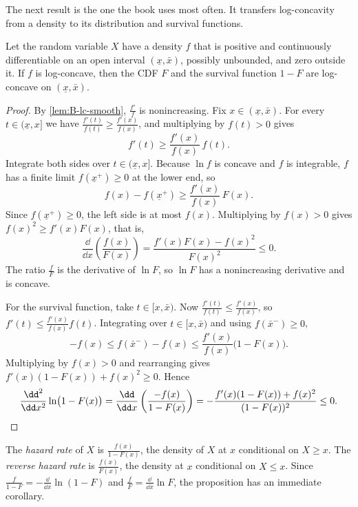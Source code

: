 The next result is the one the book uses most often. It transfers log-concavity from a density to its
distribution and survival functions.

\begin{proposition}\label{prop:B-lc-cdf}
Let the random variable $X$ have a density $f$ that is positive and continuously differentiable on an open
interval $(\underline x, \bar x)$, possibly unbounded, and zero outside it. If $f$ is log-concave, then the CDF
$F$ and the survival function $1 - F$ are log-concave on $(\underline x, \bar x)$.
\end{proposition}

\begin{proof}
By \cref{lem:B-lc-smooth}, $\frac{f'}{f}$ is nonincreasing. Fix $x \in (\underline x, \bar x)$. For every
$t \in (\underline x, x]$ we have $\frac{f'(t)}{f(t)} \geq \frac{f'(x)}{f(x)}$, and multiplying by $f(t) > 0$ gives
\[
  f'(t) \geq \frac{f'(x)}{f(x)}\,f(t).
\]
Integrate both sides over $t \in (\underline x, x]$. Because $\ln f$ is concave and $f$ is integrable, $f$ has a
finite limit $f(\underline x^+) \geq 0$ at the lower end, so
\[
  f(x) - f(\underline x^+) \geq \frac{f'(x)}{f(x)}\,F(x).
\]
Since $f(\underline x^+) \geq 0$, the left side is at most $f(x)$. Multiplying by $f(x) > 0$ gives
$f(x)^2 \geq f'(x)F(x)$, that is,
\[
  \frac{\dd}{\dd x}\left(\frac{f(x)}{F(x)}\right) = \frac{f'(x)F(x) - f(x)^2}{F(x)^2} \leq 0.
\]
The ratio $\frac{f}{F}$ is the derivative of $\ln F$, so $\ln F$ has a nonincreasing derivative and is concave.

For the survival function, take $t \in [x, \bar x)$. Now $\frac{f'(t)}{f(t)} \leq \frac{f'(x)}{f(x)}$, so
$f'(t) \leq \frac{f'(x)}{f(x)}f(t)$. Integrating over $t \in [x, \bar x)$ and using $f(\bar x^-) \geq 0$,
\[
  -f(x) \leq f(\bar x^-) - f(x) \leq \frac{f'(x)}{f(x)}\bigl(1 - F(x)\bigr).
\]
Multiplying by $f(x) > 0$ and rearranging gives $f'(x)(1 - F(x)) + f(x)^2 \geq 0$. Hence
\[
  \frac{\dd^2}{\dd x^2}\ln\bigl(1 - F(x)\bigr) = \frac{\dd}{\dd x}\left(\frac{-f(x)}{1 - F(x)}\right)
  = -\frac{f'(x)(1 - F(x)) + f(x)^2}{(1 - F(x))^2} \leq 0. \qedhere
\]
\end{proof}

The \emph{hazard rate} of $X$ is $\frac{f(x)}{1 - F(x)}$, the density of $X$ at $x$ conditional on $X \geq x$. The
\emph{reverse hazard rate} is $\frac{f(x)}{F(x)}$, the density at $x$ conditional on $X \leq x$. Since
$\frac{f}{1 - F} = -\frac{\dd}{\dd x}\ln(1 - F)$ and $\frac{f}{F} = \frac{\dd}{\dd x}\ln F$, the proposition has an
immediate corollary.

